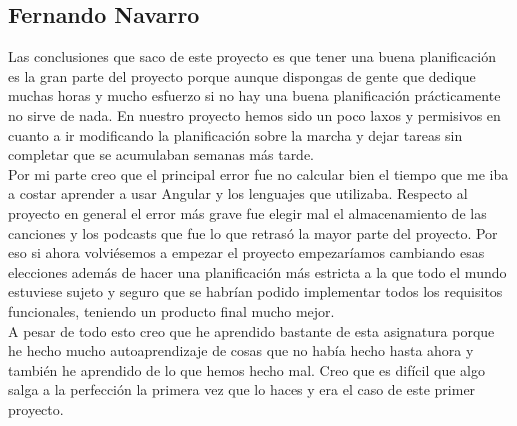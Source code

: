 \documentclass{article}
\begin{document}
\subsection*{Fernando Navarro}
Las conclusiones que saco de este proyecto es que tener una buena planificación es la gran parte del proyecto porque aunque dispongas de gente que dedique muchas horas y mucho esfuerzo si no hay una buena planificación prácticamente no sirve de nada. En nuestro proyecto hemos sido un poco laxos y permisivos en cuanto a ir modificando la planificación sobre la marcha y dejar tareas sin completar que se acumulaban semanas más tarde.\\
\hfill \break
Por mi parte creo que el principal error fue no calcular bien el tiempo que me iba a costar aprender a usar Angular y los lenguajes que utilizaba. Respecto al proyecto en general el error más grave fue elegir mal el almacenamiento de las canciones y los podcasts que fue lo que retrasó la mayor parte del proyecto. Por eso si ahora volviésemos a empezar el proyecto empezaríamos cambiando esas elecciones además de hacer una planificación más estricta a la que todo el mundo estuviese sujeto y seguro que se habrían podido implementar todos los requisitos funcionales, teniendo un producto final mucho mejor.\\
\hfill \break
A pesar de todo esto creo que he aprendido bastante de esta asignatura porque he hecho mucho autoaprendizaje de cosas que no había hecho hasta ahora y también he aprendido de lo que hemos hecho mal. Creo que es difícil que algo salga a la perfección la primera vez que lo haces y era el caso de este primer proyecto.
\end{document}
